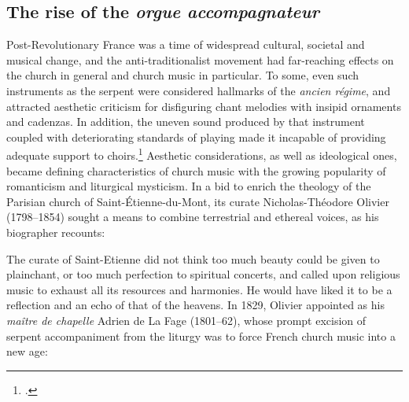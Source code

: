 \subsection{The rise of the \emph{orgue accompagnateur}}
\label{sc:orgue_accompagnateur}
Post-Revolutionary France was a time of widespread cultural, societal and musical change, and the anti-traditionalist movement had far-reaching effects on the church in general and church music in particular.
To some, even such instruments as the serpent were considered hallmarks of the \emph{ancien régime}, and attracted aesthetic criticism for disfiguring chant melodies with insipid ornaments and cadenzas.
In addition, the uneven sound produced by that instrument coupled with deteriorating standards of playing made it incapable of providing adequate support to choirs.\footcite[12]{HillsmanInstrumentalAccompanimentPlainChant1980}
Aesthetic considerations, as well as ideological ones, became defining characteristics of church music with the growing popularity of romanticism and liturgical mysticism.
In a bid to enrich the theology of the Parisian church of Saint-Étienne-du-Mont, its curate Nicholas-Théodore Olivier (1798--1854) sought a means to combine terrestrial and ethereal voices, as his biographer recounts:

  {\cite[171]{BouclonHistoiremonseigneurOlivier1855}}
{
The curate of Saint-Etienne did not think too much beauty could be given to plainchant, or too much perfection to spiritual concerts, and called upon religious music to exhaust all its resources and harmonies. He would have liked it to be a reflection and an echo of that of the heavens.
}
\noindent
{}%
In 1829, Olivier appointed as his \emph{maître de chapelle} Adrien de La Fage (1801--62), whose prompt excision of serpent accompaniment from the liturgy was to force French church music into a new age:

